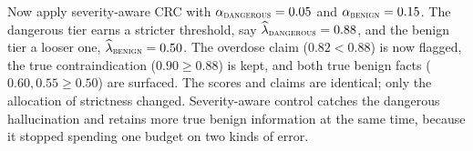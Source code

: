 Now apply severity-aware CRC with $\alpha_{\textsc{dangerous}} = 0.05$ and
$\alpha_{\textsc{benign}} = 0.15$. The dangerous tier earns a stricter threshold,
say $\widehat{\lambda}_{\textsc{dangerous}} = 0.88$, and the benign tier a looser
one, $\widehat{\lambda}_{\textsc{benign}} = 0.50$. The overdose claim
($0.82 < 0.88$) is now flagged, the true contraindication ($0.90 \ge 0.88$) is
kept, and both true benign facts ($0.60, 0.55 \ge 0.50$) are surfaced. The scores
and claims are identical; only the allocation of strictness changed. Severity-aware
control catches the dangerous hallucination and retains more true benign
information at the same time, because it stopped spending one budget on two kinds
of error.
